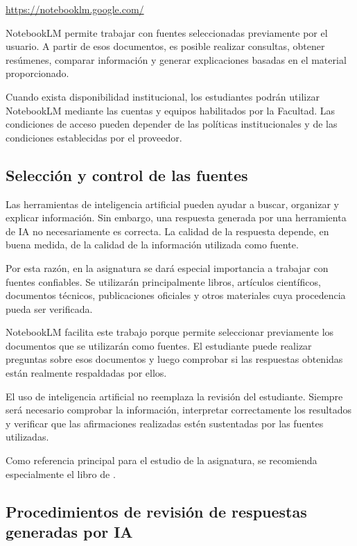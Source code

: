\documentclass[10pt]{article}
\begin{document}
\begin{center}
\url{https://notebooklm.google.com/}
\end{center}

NotebookLM permite trabajar con fuentes seleccionadas previamente por el usuario. A partir de esos documentos, es posible realizar consultas, obtener resúmenes, comparar información y generar explicaciones basadas en el material proporcionado.\parencite{googleNotebookLM}

Cuando exista disponibilidad institucional, los estudiantes podrán utilizar NotebookLM mediante las cuentas y equipos habilitados por la Facultad. Las condiciones de acceso pueden depender de las políticas institucionales y de las condiciones establecidas por el proveedor.


\subsection{Selección y control de las fuentes}

Las herramientas de inteligencia artificial pueden ayudar a buscar, organizar y explicar información. Sin embargo, una respuesta generada por una herramienta de IA no necesariamente es correcta. La calidad de la respuesta depende, en buena medida, de la calidad de la información utilizada como fuente.

Por esta razón, en la asignatura se dará especial importancia a trabajar con fuentes confiables. Se utilizarán principalmente libros, artículos científicos, documentos técnicos, publicaciones oficiales y otros materiales cuya procedencia pueda ser verificada.

NotebookLM facilita este trabajo porque permite seleccionar previamente los documentos que se utilizarán como fuentes. El estudiante puede realizar preguntas sobre esos documentos y luego comprobar si las respuestas obtenidas están realmente respaldadas por ellos.\parencite{googleNotebookLM}

El uso de inteligencia artificial no reemplaza la revisión del estudiante. Siempre será necesario comprobar la información, interpretar correctamente los resultados y verificar que las afirmaciones realizadas estén sustentadas por las fuentes utilizadas.

Como referencia principal para el estudio de la asignatura, se recomienda especialmente el libro de \textcite{vanhorne2010fundamentos}.

\subsection{Procedimientos de revisión de respuestas generadas por IA}
\end{document}
